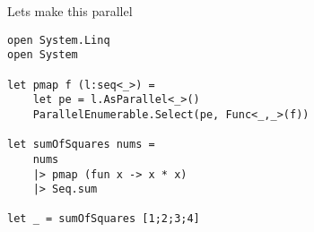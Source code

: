 \documentclass[landscape]{slides}
\begin{document}
\begin{slide}{Lets make this parallel}
\begin{verbatim}
open System.Linq
open System

let pmap f (l:seq<_>) =
    let pe = l.AsParallel<_>()
    ParallelEnumerable.Select(pe, Func<_,_>(f))

let sumOfSquares nums =
    nums
    |> pmap (fun x -> x * x) 
    |> Seq.sum

let _ = sumOfSquares [1;2;3;4]
\end{verbatim}
\end{slide}
\end{document}
